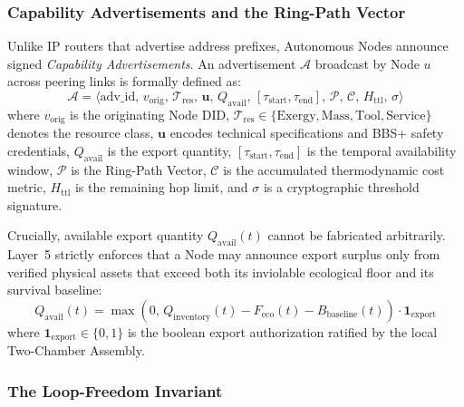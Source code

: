 \subsubsection{Capability Advertisements and the Ring-Path Vector}

Unlike IP routers that advertise address prefixes, Autonomous Nodes announce signed \textit{Capability Advertisements}. An advertisement $\mathcal{A}$ broadcast by Node $u$ across peering links is formally defined as:
\begin{equation}
\mathcal{A} = \big\langle \mathrm{adv\_id}, \, v_{\mathrm{orig}}, \, \mathcal{T}_{\mathrm{res}}, \, \mathbf{u}, \, Q_{\mathrm{avail}}, \, [\tau_{\mathrm{start}}, \tau_{\mathrm{end}}], \, \mathcal{P}, \, \mathcal{C}, \, H_{\mathrm{ttl}}, \, \sigma \big\rangle
\label{eq:capability_advertisement}
\end{equation}
where $v_{\mathrm{orig}}$ is the originating Node DID, $\mathcal{T}_{\mathrm{res}} \in \{\mathrm{Exergy}, \mathrm{Mass}, \mathrm{Tool}, \mathrm{Service}\}$ denotes the resource class, $\mathbf{u}$ encodes technical specifications and BBS+ safety credentials, $Q_{\mathrm{avail}}$ is the export quantity, $[\tau_{\mathrm{start}}, \tau_{\mathrm{end}}]$ is the temporal availability window, $\mathcal{P}$ is the Ring-Path Vector, $\mathcal{C}$ is the accumulated thermodynamic cost metric, $H_{\mathrm{ttl}}$ is the remaining hop limit, and $\sigma$ is a cryptographic threshold signature.

Crucially, available export quantity $Q_{\mathrm{avail}}(t)$ cannot be fabricated arbitrarily. Layer~5 strictly enforces that a Node may announce export surplus only from verified physical assets that exceed both its inviolable ecological floor and its survival baseline:
\begin{equation}
Q_{\mathrm{avail}}(t) = \max\left(0, \, Q_{\mathrm{inventory}}(t) - F_{\mathrm{eco}}(t) - B_{\mathrm{baseline}}(t)\right) \cdot \mathbf{1}_{\mathrm{export}}
\label{eq:export_surplus_bound}
\end{equation}
where $\mathbf{1}_{\mathrm{export}} \in \{0, 1\}$ is the boolean export authorization ratified by the local Two-Chamber Assembly.

\subsubsection{The Loop-Freedom Invariant}

